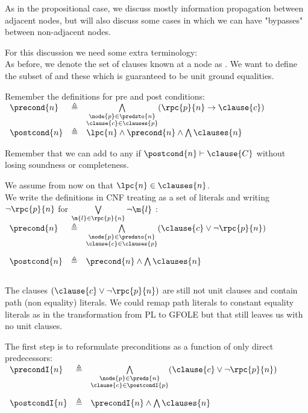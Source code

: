 As in the propositional case, we discuss mostly information propagation between adjacent nodes, but will also discuss some cases in which we can have "bypasses" between non-adjacent nodes.

For this discussion we need some extra terminology:\\
As before, we denote the set of clauses known at a node  as .
We want to define the subset of  and  these which is guaranteed to be unit ground equalities.

Remember the definitions for pre and post conditions:\\
$
\begin{array}{lll}
	\precond{n}  &\triangleq   & \bigwedge\limits_{\substack{\node{p} \in \predsto{n} \\ \clause{c} \in \clauses{p}}} (\rpc{p}{n} \rightarrow \clause{c}) \\
	\postcond{n} & \triangleq  & \lpc{n} \land \precond{n} \land \bigwedge \clauses{n}
\end{array}
$

Remember that we can add to  any  if $\postcond{n} \vdash \clause{C}$ without losing soundness or completeness.

We assume from now on that $\lpc{n} \in \clauses{n}$.\\
We write the definitions in CNF treating  as a set of literals and writing 
$\lnot \rpc{p}{n}$ for $\bigvee\limits_{\m{l} \in \rpc{p}{n}} \lnot \m{l}$ :\\
$
\begin{array}{lll}
	\vspace{10pt}
	\precond{n}  & \triangleq & \bigwedge\limits_{\substack{\node{p} \in \predsto{n} \\ \clause{c} \in \clauses{p}}} 
(\clause{c} \lor \lnot \rpc{p}{n} )\\
	\vspace{10pt}
	\postcond{n} & \triangleq & \precond{n} \land \bigwedge \clauses{n} \\
\end{array}
$

The clauses $(\clause{c} \lor \lnot \rpc{p}{n} )$ are still not unit clauses and contain path (non equality) literals.
We could remap path literals to constant equality literals as in the transformation from PL to GFOLE but that still leaves us with no unit clauses.

The first step is to reformulate preconditions as a function of only direct predecessors:\\
$
\begin{array}{lll}
	\vspace{10pt}
	\precondI{n}   & \triangleq & \bigwedge\limits_{\substack{ \node{p} \in \preds{n} \\\clause{c} \in \postcondI{p}}}
( \clause{c} \lor \lnot \rpc{p}{n}) \\
	\vspace{10pt}
	\postcondI{n} & \triangleq & \precondI{n} \land \bigwedge \clauses{n}
\end{array}
$

